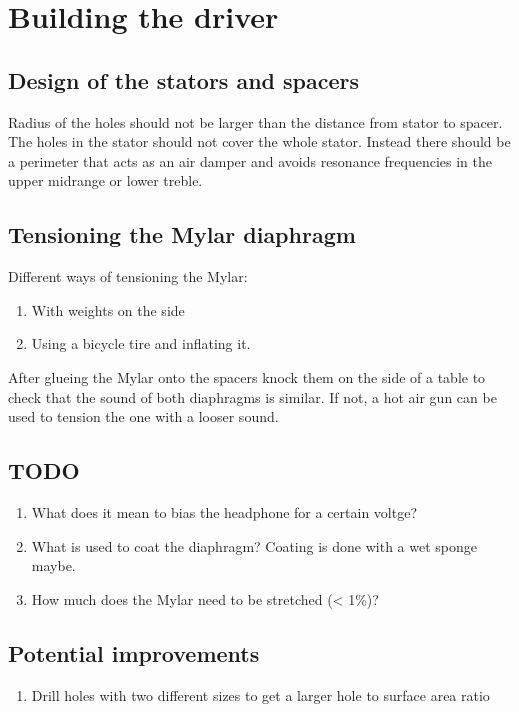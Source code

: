 \documentclass{article}
\begin{document}
\section{Building the driver}
\label{s:driver}

\subsection{Design of the stators and spacers}
\label{s:driver:design}
Radius of the holes should not be larger than the distance from stator to spacer. The holes in the stator should not cover the whole stator. Instead there should be a perimeter that acts as an air damper and avoids resonance frequencies in the upper midrange or lower treble.

\subsection{Tensioning the Mylar diaphragm}
\label{s:driver:tension}
Different ways of tensioning the Mylar:
\begin{enumerate}
    \item With weights on the side
    \item Using a bicycle tire and inflating it.
\end{enumerate}
After glueing the Mylar onto the spacers knock them on the side of a table to check that the sound of both diaphragms is similar. If not, a hot air gun can be used to tension the one with a looser sound.

\subsection{TODO}
\begin{enumerate}
    \item What does it mean to bias the headphone for a certain voltge?
    \item What is used to coat the diaphragm? Coating is done with a wet sponge maybe.
    \item How much does the Mylar need to be stretched (< 1\%)?
\end{enumerate}

\subsection{Potential improvements}
\begin{enumerate}
    \item Drill holes with two different sizes to get a larger hole to surface area ratio
\end{enumerate}
\end{document}
